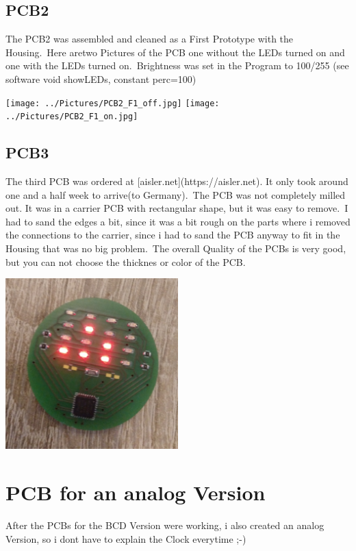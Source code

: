 \subsection{PCB2}
The PCB2 was assembled and cleaned as a First Prototype with the Housing.\
Here aretwo Pictures of the PCB one without the LEDs turned on and one with the LEDs turned on.\
Brightness was set in the Program to 100/255 (see software void showLEDs, constant perc=100) 
\begin{center}
\texttt{[image: ../Pictures/PCB2\_F1\_off.jpg]} \texttt{[image: ../Pictures/PCB2\_F1\_on.jpg]}

\end{center}

\subsection{PCB3}
The third PCB was ordered at [aisler.net](https://aisler.net). It only took around one and a half week to arrive(to Germany).\
The PCB was not completely milled out. It was in a carrier PCB with rectangular shape, but it was easy to remove.\
I had to sand the edges a bit, since it was a bit rough on the parts where i removed the connections to the carrier, since i had to sand the PCB anyway to fit in the Housing that was no big problem.\
The overall Quality of the PCBs is very good, but you can not choose the thicknes or color of the PCB.\
\begin{center}
  \includegraphics[width=0.5\textwidth]{../Pictures/PCB3.jpg}
\end{center}

\newpage
\section{PCB for an analog Version}
After the PCBs for the BCD Version were working, i also created an analog Version, so i dont have to explain the Clock everytime ;-)

